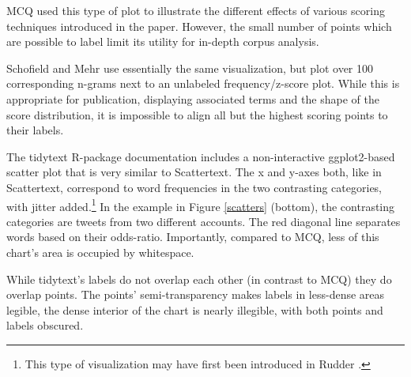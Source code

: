 \documentclass[11pt,a4paper]{article}
\begin{document}
MCQ used this type of plot to illustrate the different effects of various scoring techniques introduced in the paper.  However, the small number of points which are possible to label limit its utility for in-depth corpus analysis.  

Schofield and Mehr  use essentially the same visualization, but plot over 100 corresponding n-grams next to an unlabeled frequency/z-score plot.  While this is appropriate for publication, displaying associated terms and the shape of the score distribution, it is impossible to align all but the highest scoring points to their labels. 

The tidytext R-package \cite{tidytext} documentation includes a non-interactive ggplot2-based scatter plot that is very similar to Scattertext.   The x and y-axes both, like in Scattertext, correspond to word frequencies in the two contrasting categories, with jitter added.\footnote{This type of visualization may have first been introduced in Rudder .}  In the example in Figure \ref{scatters} (bottom), the contrasting categories are tweets from two different accounts.  The red diagonal line separates words based on their odds-ratio.  Importantly, compared to MCQ, less of this chart's area is occupied by whitespace. 

While tidytext's labels do not overlap each other (in contrast to MCQ) they do overlap points.  The points' semi-transparency makes labels in less-dense areas legible, the dense interior of the chart is nearly illegible, with both points and labels obscured. 
\end{document}
